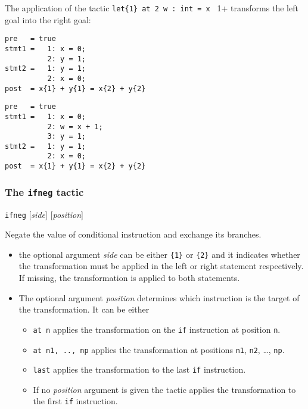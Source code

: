 \Example The application of the tactic 
\verb+let{1} at 2 w : int = x + 1+ transforms the left goal into the
right goal:

\begin{minipage}[b]{0.5\linewidth}
\centering
\begin{verbatim}
pre   = true
stmt1 =   1: x = 0;
          2: y = 1;
stmt2 =   1: y = 1;
          2: x = 0;
post  = x{1} + y{1} = x{2} + y{2}
\end{verbatim}
\end{minipage}
\begin{minipage}[b]{0.5\linewidth}
\centering
\begin{verbatim}
pre   = true
stmt1 =   1: x = 0;
          2: w = x + 1;
          3: y = 1;
stmt2 =   1: y = 1;
          2: x = 0;
post  = x{1} + y{1} = x{2} + y{2}
\end{verbatim}
\end{minipage}


\subsubsection{The \texttt{ifneg} tactic}\label{tac:ifneg} \DONE
\Syntax \verb+ifneg+ [\textit{side}] [\textit{position}]

\Description Negate the value of conditional instruction and exchange its branches.

\begin{itemize}
 \item the optional argument \textit{side} can be either \verb+{1}+ or
  \verb+{2}+ and it indicates whether the
  transformation must be applied in the left or right
  statement respectively. 
  If missing, the transformation is applied to both statements.
 \item The optional argument \textit{position} determines which instruction is
  the target of the transformation. It can be either
  \begin{itemize}
  \item \verb+at n+ applies the transformation on the \verb+if+ instruction
  at position \verb+n+.
  \item \verb+at n1, .., np+ applies the transformation at positions \verb+n1+, \verb+n2+, \ldots, \verb+np+. 
  \item \verb+last+ applies the transformation to the last \verb+if+ instruction.
  \item If no \textit{position} argument is given the tactic applies the transformation to the first \verb+if+
  instruction.
\end{itemize} 
\end{itemize}

